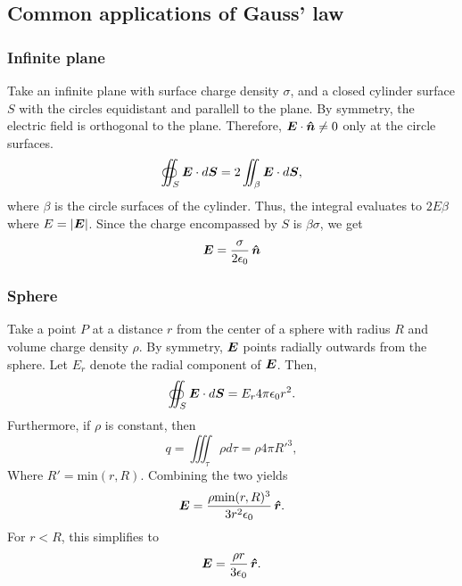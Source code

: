 \subsection{Common applications of Gauss' law}
    \subsubsection{Infinite plane}
        Take an infinite plane with surface charge density $\sigma$, 
        and a closed cylinder surface $S$ with the circles equidistant and parallell to the plane. 
        By symmetry, the electric field is orthogonal to the plane. Therefore, $\E\cdot\hat{n} \neq 0$ only at the circle surfaces. 
        \begin{equation*}
            \oiint_S \bm{E}\cdot d\bm{S} = 2\iint_\beta \bm{E}\cdot d\bm{S},
        \end{equation*}
        where $\beta$ is the circle surfaces of the cylinder. Thus, the integral evaluates to $2E\beta$ where $E = |\bm{E}|$. 
        Since the charge encompassed by $S$ is $\beta\sigma$, we get
        \begin{equation}
            \E = \frac{\sigma}{2\e}\,\hat{n}
        \end{equation}

    \subsubsection{Sphere}
        Take a point $P$ at a distance $r$ from the center of a sphere with radius $R$ and volume charge density $\rho$. 
        By symmetry, $\bm{E}$ points radially outwards from the sphere. Let $E_r$ denote the radial component of $\bm{E}$. Then, 
        \begin{equation*}
            \oiint_S \bm{E}\cdot d\bm{S} = E_r4\pi\epsilon_0 r^2.
        \end{equation*}
        Furthermore, if $\rho$ is constant, then
        \begin{equation*}
            q = \iiint_\tau \rho d\tau = \rho4\pi R'^3,
        \end{equation*}
        Where $R' = \text{min}(r, R)$. Combining the two yields
        \begin{equation}
            \E = \frac{\rho \text{min}(r, R)^3}{3r^2\e}\,\hat{r}.
        \end{equation}
        For $r < R$, this simplifies to
        \begin{equation}
            \E = \frac{\rho r}{3\e}\,\hat{r}.
        \end{equation}

